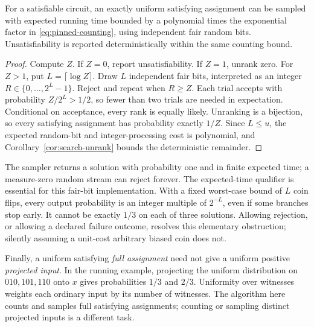 \begin{corollary}
\label{cor:exact-sampling}
For a satisfiable circuit, an exactly uniform satisfying assignment
can be sampled with expected running time bounded by a polynomial
times the exponential factor in \eqref{eq:pinned-counting}, using
independent fair random bits. Unsatisfiability is reported
deterministically within the same counting bound.
\end{corollary}
\begin{proof}
Compute $Z$. If $Z=0$, report unsatisfiability. If $Z=1$, unrank zero. For $Z>1$, put
$L=\lceil\log Z\rceil$. Draw $L$ independent fair bits, interpreted
as an integer $R\in\{0,\ldots,2^L-1\}$. Reject and repeat when
$R\ge Z$. Each trial accepts with probability $Z/2^L>1/2$, so
fewer than two trials are needed in expectation. Conditional on
acceptance, every rank is equally likely. Unranking is a bijection,
so every satisfying assignment has probability exactly $1/Z$.
Since $L\le u$, the expected random-bit and integer-processing
cost is polynomial, and Corollary~\ref{cor:search-unrank} bounds the
deterministic remainder.
\end{proof}

The sampler returns a solution with probability one and in finite expected
time; a measure-zero random stream can reject forever. The expected-time
qualifier is essential for this fair-bit implementation. With a fixed worst-case bound of $L$ coin
flips, every output probability is an integer multiple of $2^{-L}$,
even if some branches stop early. It cannot be exactly $1/3$ on
each of three solutions. Allowing rejection, or allowing a declared
failure outcome, resolves this elementary obstruction; silently
assuming a unit-cost arbitrary biased coin does not.

Finally, a uniform satisfying \emph{full assignment} need not give
a uniform positive \emph{projected input}. In the running example,
projecting the uniform distribution on $010,101,110$ onto $x$ gives
probabilities $1/3$ and $2/3$. Uniformity over witnesses weights each
ordinary input by its number of witnesses. The algorithm here counts
and samples full satisfying assignments; counting or sampling distinct
projected inputs is a different task.
